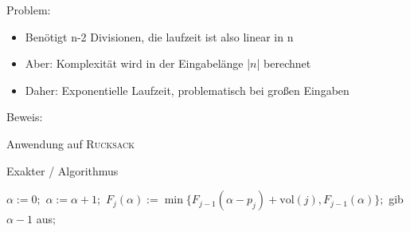 \begin{frame}
Problem:

\begin{itemize}
\item
Benötigt n-2 Divisionen, die laufzeit ist also linear in n
\item
Aber: Komplexität wird in der Eingabelänge |$n$| berechnet
\item
Daher: Exponentielle Laufzeit, problematisch bei großen Eingaben

\end{itemize}
\end{frame}

\begin{frame}
Beweis:

\end{frame}

\begin{frame}
Anwendung auf \textsc{Rucksack}
\newline

\begin{algorithm}[H]
    \caption{Exakter \rucksack/ Algorithmus}
        \begin{algorithmic}
            \State $\alpha:=0;$
            \Repeat
            \State $\alpha:=\alpha+1;$
            \State $F_j(\alpha):=\min\{F_{j-1}(\alpha-p_j)+\text{vol}(j),F_{j-1}(\alpha)\};$
            \EndFor
            \State gib $\alpha-1$ aus$;$
        \end{algorithmic}
\end{algorithm}

\end{frame}